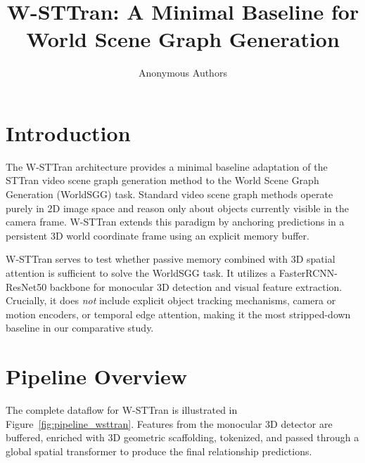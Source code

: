 \documentclass{article}
\title{W-STTran: A Minimal Baseline for World Scene Graph Generation}
\author{Anonymous Authors}
\begin{document}
\maketitle

\section{Introduction}
\label{sec:intro}

The W-STTran architecture provides a minimal baseline adaptation of the STTran video scene graph generation method to the World Scene Graph Generation (WorldSGG) task. Standard video scene graph methods operate purely in 2D image space and reason only about objects currently visible in the camera frame. W-STTran extends this paradigm by anchoring predictions in a persistent 3D world coordinate frame using an explicit memory buffer.

W-STTran serves to test whether passive memory combined with 3D spatial attention is sufficient to solve the WorldSGG task. It utilizes a FasterRCNN-ResNet50 backbone for monocular 3D detection and visual feature extraction. Crucially, it does \emph{not} include explicit object tracking mechanisms, camera or motion encoders, or temporal edge attention, making it the most stripped-down baseline in our comparative study.

\section{Pipeline Overview}
\label{sec:pipeline}

The complete dataflow for W-STTran is illustrated in Figure~\ref{fig:pipeline_wsttran}. Features from the monocular 3D detector are buffered, enriched with 3D geometric scaffolding, tokenized, and passed through a global spatial transformer to produce the final relationship predictions.
\end{document}
